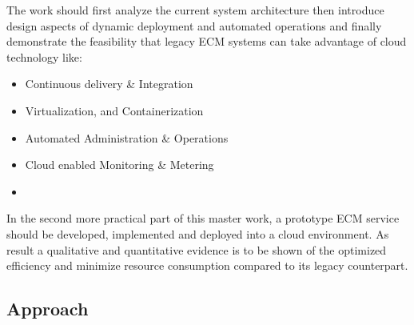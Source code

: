The work should first analyze the current system architecture then introduce design aspects of dynamic deployment and automated operations and finally demonstrate the feasibility that legacy ECM systems can take advantage of cloud technology like: 

\begin{itemize}
\item Continuous delivery \& Integration
\item Virtualization, and Containerization 
\item Automated Administration \& Operations 
\item Cloud enabled Monitoring \& Metering 
\item 
\end{itemize}

In the second more practical part of this master work, a prototype ECM service should be developed, implemented and deployed into a cloud environment. As result a qualitative and quantitative evidence is to be shown of the optimized efficiency and minimize resource consumption compared to its legacy counterpart.




 



\subsection{Approach} %

